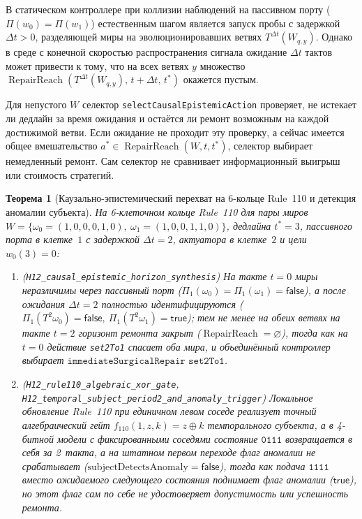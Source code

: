 \documentclass[11pt,a4paper]{article}
\theoremstyle{cleanthm}
\newtheorem{theorem}{Теорема}[section]
\theoremstyle{cleandef}
\DeclareMathOperator{\RepairReach}{RepairReach}
\begin{document}
В статическом контроллере при коллизии наблюдений на пассивном порту ($\Pi(w_0)=\Pi(w_1)$) естественным шагом является запуск пробы с задержкой $\Delta t>0$, разделяющей миры на эволюционировавших ветвях $T^{\Delta t}(W_{q,y})$. Однако в среде с конечной скоростью распространения сигнала ожидание $\Delta t$ тактов может привести к тому, что на всех ветвях $y$ множество $\RepairReach(T^{\Delta t}(W_{q,y}),\, t+\Delta t,\, t^*)$ окажется пустым.

Для непустого $W$ селектор \texttt{selectCausalEpistemicAction} проверяет, не истекает ли дедлайн за время ожидания и остаётся ли ремонт возможным на каждой достижимой ветви. Если ожидание не проходит эту проверку, а сейчас имеется общее вмешательство $a^*\in\RepairReach(W,t,t^*)$, селектор выбирает немедленный ремонт. Сам селектор не сравнивает информационный выигрыш или стоимость стратегий.

\begin{theorem}[Каузально-эпистемический перехват на 6-кольце Rule~110 и детекция аномалии субъекта]
\label{thm:h12_synthesis}
На 6-клеточном кольце Rule~110 для пары миров $W=\{\omega_0=(1,0,0,0,1,0),\ \omega_1=(1,0,0,1,1,0)\}$, дедлайна $t^*=3$, пассивного порта в клетке~$1$ с задержкой $\Delta t=2$, актуатора в клетке~$2$ и цели $w_0(3)=0$:
\begin{enumerate}
  \item (\texttt{H12\_causal\_\allowbreak epistemic\_\allowbreak horizon\_\allowbreak synthesis}) На такте $t=0$ миры неразличимы через пассивный порт ($\Pi_1(\omega_0)=\Pi_1(\omega_1)=\mathsf{false}$), а после ожидания $\Delta t=2$ полностью идентифицируются ($\Pi_1(T^2\omega_0)=\mathsf{false},\ \Pi_1(T^2\omega_1)=\mathsf{true}$); тем не менее на обеих ветвях на такте $t=2$ горизонт ремонта закрыт ($\RepairReach=\varnothing$), тогда как на $t=0$ действие \texttt{set2To1} спасает оба мира, и объединённый контроллер выбирает $\texttt{immediateSurgicalRepair\ set2To1}$.
  \item (\texttt{H12\_rule110\_\allowbreak algebraic\_\allowbreak xor\_\allowbreak gate}, \texttt{H12\_temporal\_\allowbreak subject\_\allowbreak period2\_\allowbreak and\_\allowbreak anomaly\_\allowbreak trigger}) Локальное обновление Rule~110 при единичном левом соседе реализует точный алгебраический гейт $f_{110}(1,z,k)=z\oplus k$ темпорального субъекта, а в 4-битной модели с фиксированными соседями состояние $\mathtt{0111}$ возвращается в себя за 2~такта, а на штатном первом переходе флаг аномалии не срабатывает ($\mathrm{subjectDetectsAnomaly}=\mathsf{false}$), тогда как подача $\mathtt{1111}$ вместо ожидаемого следующего состояния поднимает флаг аномалии ($\mathsf{true}$), но этот флаг сам по себе не удостоверяет допустимость или успешность ремонта.
\end{enumerate}
\end{theorem}
\end{document}
